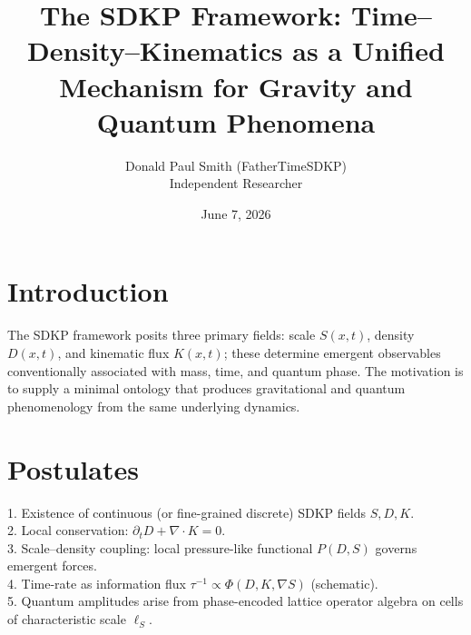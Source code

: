 \documentclass[10pt,twocolumn]{article}
\title{The SDKP Framework: Time–Density–Kinematics as a Unified Mechanism for Gravity and Quantum Phenomena}
\author{Donald Paul Smith (FatherTimeSDKP)\\
\small Independent Researcher}
\date{June 7, 2026}
\begin{document}

\section*{Introduction}
The SDKP framework posits three primary fields: scale $S(x,t)$, density $D(x,t)$, and kinematic flux $K(x,t)$; these determine emergent observables conventionally associated with mass, time, and quantum phase. The motivation is to supply a minimal ontology that produces gravitational and quantum phenomenology from the same underlying dynamics.

\section*{Postulates}
1. Existence of continuous (or fine-grained discrete) SDKP fields $S,D,K$.\\
2. Local conservation: $\partial_t D + \nabla\cdot K = 0$.\\
3. Scale–density coupling: local pressure-like functional $P(D,S)$ governs emergent forces.\\
4. Time-rate as information flux $\tau^{-1}\propto\Phi(D,K,\nabla S)$ (schematic).\\
5. Quantum amplitudes arise from phase-encoded lattice operator algebra on cells of characteristic scale $\ell_S$.
\end{document}
